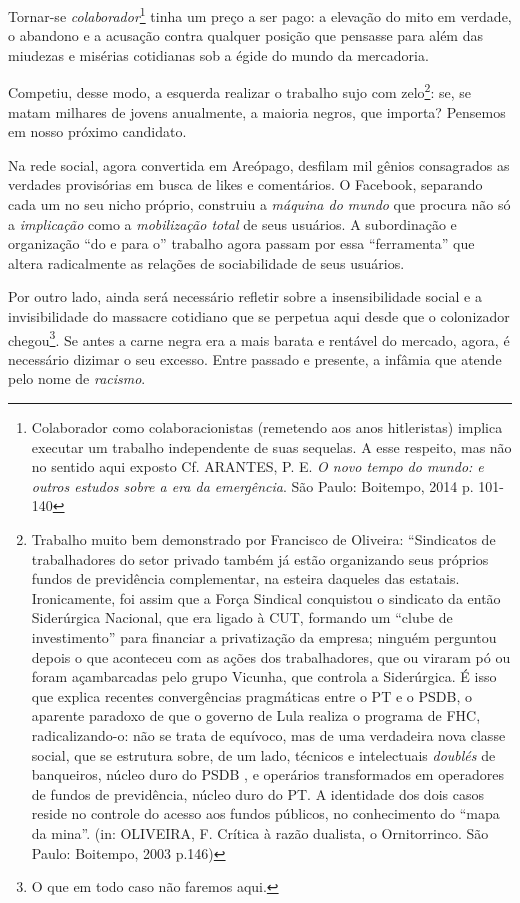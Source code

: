 Tornar-se \emph{colaborador}\footnote{Colaborador como colaboracionistas
  (remetendo aos anos hitleristas) implica executar um trabalho
  independente de suas sequelas. A esse respeito, mas não no sentido
  aqui exposto Cf. ARANTES, P. E. \emph{O novo tempo do mundo: e outros
  estudos sobre a era da emergência}. São Paulo: Boitempo, 2014 p.
  101-140} tinha um preço a ser pago: a elevação do mito em verdade, o
abandono e a acusação contra qualquer posição que pensasse para além das
miudezas e misérias cotidianas sob a égide do mundo da mercadoria.

Competiu, desse modo, a esquerda realizar o trabalho sujo com
zelo\footnote{Trabalho muito bem demonstrado por Francisco de Oliveira:
  ``Sindicatos de trabalhadores do setor privado também já estão
  organizando seus próprios fundos de previdência complementar, na
  esteira daqueles das estatais. Ironicamente, foi assim que a Força
  Sindical conquistou o sindicato da então Siderúrgica Nacional, que era
  ligado à CUT, formando um ``clube de investimento'' para financiar a
  privatização da empresa; ninguém perguntou depois o que aconteceu com
  as ações dos trabalhadores, que ou viraram pó ou foram açambarcadas
  pelo grupo Vicunha, que controla a Siderúrgica. É isso que explica
  recentes convergências pragmáticas entre o PT e o PSDB, o aparente
  paradoxo de que o governo de Lula realiza o programa de FHC,
  radicalizando-o: não se trata de equívoco, mas de uma verdadeira nova
  classe social, que se estrutura sobre, de um lado, técnicos e
  intelectuais \emph{doublés} de banqueiros, núcleo duro do PSDB , e
  operários transformados em operadores de fundos de previdência, núcleo
  duro do PT. A identidade dos dois casos reside no controle do acesso
  aos fundos públicos, no conhecimento do ``mapa da mina''. (in:
  OLIVEIRA, F. Crítica à razão dualista, o Ornitorrinco. São Paulo:
  Boitempo, 2003 p.146)}: se, se matam milhares de jovens anualmente, a
maioria negros, que importa? Pensemos em nosso próximo candidato.

Na rede social, agora convertida em Areópago, desfilam mil gênios
consagrados as verdades provisórias em busca de likes e comentários. O
Facebook, separando cada um no seu nicho próprio, construiu a
\emph{máquina do mundo} que procura não só a \emph{implicação} como a
\emph{mobilização total} de seus usuários. A subordinação e organização
``do e para o'' trabalho agora passam por essa ``ferramenta'' que altera
radicalmente as relações de sociabilidade de seus usuários.

Por outro lado, ainda será necessário refletir sobre a insensibilidade
social e a invisibilidade do massacre cotidiano que se perpetua aqui
desde que o colonizador chegou\footnote{O que em todo caso não faremos
  aqui.}. Se antes a carne negra era a mais barata e rentável do
mercado, agora, é necessário dizimar o seu excesso. Entre passado e
presente, a infâmia que atende pelo nome de \emph{racismo}.

